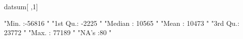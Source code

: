 \begin{Schunk}
\begin{Sinput}
 datsum[ ,1]
\end{Sinput}
\begin{Soutput}
"Min.   :-56816  " "1st Qu.: -2225  " "Median : 10565  " "Mean   : 10473  " "3rd Qu.: 23772  " "Max.   : 77189  "     "NA's   :80  " 
\end{Soutput}
\end{Schunk}
